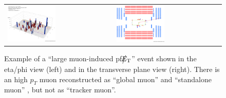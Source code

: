 %
\begin{figure}[h]
 \centering
 \begin{tabular}{ll}
   \includegraphics[width=0.47\textwidth]{fig/largeMuonInducedPfMET.eps} &
   \includegraphics[width=0.47\textwidth]{fig/largeMuonInducedPfMET_1.eps} \\
 \end{tabular}
\caption{Example of a ``large muon-induced pf$\big\slash\hspace{-1.6ex}{E_\text{T}}$'' event
shown in the eta/phi view (left) and in the transverse plane view (right). There is an high $p_{T}$ 
muon reconstructed as ``global muon'' and ``standalone muon'' , but not as ``tracker muon''.}
\label{fig:largeMuonInducedPfMET}
\end{figure}




